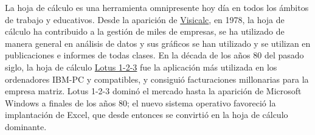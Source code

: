 \documentclass[
  letterpaper,
  DIV=11,
  numbers=noendperiod,
  oneside]{scrreprt}
\begin{document}
La hoja de cálculo es una herramienta omnipresente hoy día en todos los
ámbitos de trabajo y educativos. Desde la aparición de
\href{https://es.wikipedia.org/wiki/VisiCalc}{Visicalc}, en 1978, la
hoja de cálculo ha contribuido a la gestión de miles de empresas, se ha
utilizado de manera general en análisis de datos y sus gráficos se han
utilizado y se utilizan en publicaciones e informes de todas clases. En
la década de los años 80 del pasado siglo, la hoja de cálculo
\href{https://es.wikipedia.org/wiki/Lotus_1-2-3}{Lotus 1-2-3} fue la
aplicación más utilizada en los ordenadores IBM-PC y compatibles, y
consiguió facturaciones millonarias para la empresa matriz. Lotus 1-2-3
dominó el mercado hasta la aparición de Microsoft Windows a finales de
los años 80; el nuevo sistema operativo favoreció la implantación de
Excel, que desde entonces se convirtió en la hoja de cálculo dominante.
\end{document}
